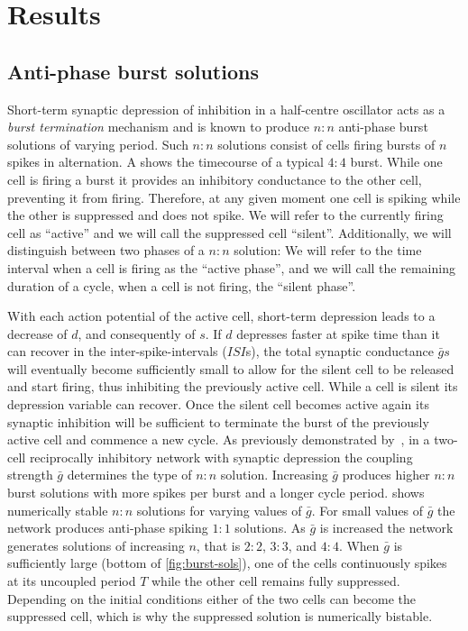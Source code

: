\section{Results}
\subsection{Anti-phase burst solutions}
Short-term synaptic depression of inhibition in a half-centre oscillator acts as a \emph{burst termination} mechanism \citep{brown1911} and is known to produce $n:n$ anti-phase burst solutions of varying period.
Such $n:n$ solutions consist of cells firing bursts of $n$ spikes in alternation.
A shows the timecourse of a typical $4:4$ burst.
While one cell is firing a burst it provides an inhibitory conductance to the other cell,  preventing it from firing.
Therefore, at any given moment one cell is spiking while the other is suppressed and does not spike.
We will refer to the currently firing cell as ``active'' and we will call the suppressed cell ``silent''.
Additionally, we will distinguish between two phases of a $n:n$ solution:
We will refer to the time interval when a cell is firing as the ``active phase'', and we will call the remaining duration of a cycle, when a cell is not firing, the ``silent  phase''.

With each action potential of the active cell, short-term depression leads to a decrease of $d$, and consequently of $s$.
If $d$ depresses faster at spike time than it can recover in the inter-spike-intervals ($ISI$s), the total synaptic conductance $\bar g s$ will eventually become sufficiently small to allow for the silent cell to be released \citep{wang1992,skinner1994} and start firing, thus inhibiting the previously active cell.
While a cell is silent its depression variable can recover.
Once the silent cell becomes active again its synaptic inhibition will be sufficient to terminate the burst of the previously active cell and commence a new cycle.
As previously demonstrated by~\citet{bose2011}, in a two-cell reciprocally inhibitory network with synaptic depression the coupling strength $\bar g$ determines the type of $n:n$ solution.
Increasing $\bar g$ produces higher $n:n$ burst solutions with more spikes per burst and a longer cycle period.
 shows numerically stable $n:n$ solutions for varying values of $\bar g$.
For small values of $\bar g$ the network produces anti-phase spiking $1:1$ solutions.
As $\bar g$ is increased the network generates solutions of increasing $n$, that is $2:2$, $3:3$, and $4:4$.
When $\bar g$ is sufficiently large (bottom of \cref{fig:burst-sols}), one of the cells continuously spikes at its uncoupled period $T$ while the other cell remains fully suppressed.
Depending on the initial conditions either of the two cells can become the suppressed cell, which is why the suppressed solution is numerically bistable.

